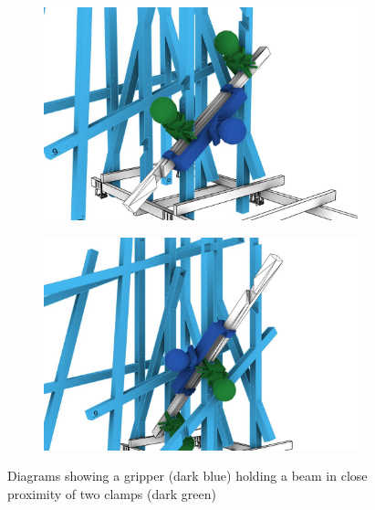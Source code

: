\begin{figure}[!h]
    \centering
    \begin{subfigure}[b]{0.49\textwidth}
        \centering
        \includegraphics[width=\textwidth]{images/05/image58.jpg}
    \end{subfigure}
    \hfill
    \begin{subfigure}[b]{0.49\textwidth}
        \centering
        \includegraphics[width=\textwidth]{images/05/image96.jpg}
    \end{subfigure}
    \caption[Diagrams showing a gripper holding a beam in close proximity of two clamps]
    {Diagrams showing a gripper (dark blue) holding a beam in close proximity of two clamps (dark green)}
    \label{fig:gripper-close-to-clamp}
\end{figure}

